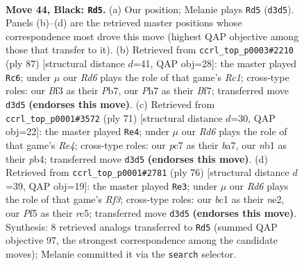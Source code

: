 \documentclass[11pt]{article}
\begin{document}
\clearpage

\begin{figure}[p]\centering
\begin{subfigure}{0.46\textwidth}\centering
\resizebox{\linewidth}{!}{%
\newchessgame
\chessboard[
  setfen={4K2k/n1P2p1p/p7/P4p2/4p3/3r1bP1/8/RNB5 b - - 2 44},
  showmover=false,
  pgfstyle=straightmove, color=movearrow, markmove={d3-d5}
]}
\caption{}
\end{subfigure}\hfill
\begin{subfigure}{0.46\textwidth}\centering
\resizebox{\linewidth}{!}{%
\newchessgame
\chessboard[
  setfen={2r5/1p3b2/rP3kp1/1N6/4p1p1/4P1K1/3R1P2/1R6 b - - 3 44},
  showmover=false,
  pgfstyle=straightmove, color=movearrow, markmove={c8-c6}
]}
\caption{}
\end{subfigure}
\\[4pt]
\begin{subfigure}{0.46\textwidth}\centering
\resizebox{\linewidth}{!}{%
\newchessgame
\chessboard[
  setfen={6k1/B1p3p1/2K2p2/4rb2/1PP4p/8/R5PP/8 b - - 6 36},
  showmover=false,
  pgfstyle=straightmove, color=movearrow, markmove={e5-e4}
]}
\caption{}
\end{subfigure}\hfill
\begin{subfigure}{0.46\textwidth}\centering
\resizebox{\linewidth}{!}{%
\newchessgame
\chessboard[
  setfen={5r2/1R1B3p/5k2/2rp1P1p/8/5R2/P3n1PK/8 w - - 4 39},
  showmover=false,
  pgfstyle=straightmove, color=movearrow, markmove={f3-e3}
]}
\caption{}
\end{subfigure}
\caption{\textbf{Move 44, Black: \texttt{Rd5}.} (a) Our position; Melanie plays \texttt{Rd5} (\texttt{d3d5}). Panels (b)--(d) are the retrieved master positions whose correspondence most drove this move (highest QAP objective among those that transfer to it). (b) Retrieved from \texttt{ccrl\_top\_p0003\#2210} (ply 87) [structural distance $d$=41, QAP obj=28]: the master played \texttt{Rc6}; under $\mu$ our \emph{Rd6} plays the role of that game's \emph{Rc1}; cross-type roles: our \emph{B}f3 as their \emph{P}b7, our \emph{P}h7 as their \emph{B}f7; transferred move \texttt{d3d5} \textbf{(endorses this move)}. (c) Retrieved from \texttt{ccrl\_top\_p0001\#3572} (ply 71) [structural distance $d$=30, QAP obj=22]: the master played \texttt{Re4}; under $\mu$ our \emph{Rd6} plays the role of that game's \emph{Re4}; cross-type roles: our \emph{p}c7 as their \emph{b}a7, our \emph{n}b1 as their \emph{p}b4; transferred move \texttt{d3d5} \textbf{(endorses this move)}. (d) Retrieved from \texttt{ccrl\_top\_p0001\#2781} (ply 76) [structural distance $d$=39, QAP obj=19]: the master played \texttt{Re3}; under $\mu$ our \emph{Rd6} plays the role of that game's \emph{Rf3}; cross-type roles: our \emph{b}c1 as their \emph{n}e2, our \emph{P}f5 as their \emph{r}c5; transferred move \texttt{d3d5} \textbf{(endorses this move)}. Synthesis: 8 retrieved analogs transferred to \texttt{Rd5} (summed QAP objective 97, the strongest correspondence among the candidate moves); Melanie committed it via the \texttt{search} selector.}
\label{fig:thought-m87}
\end{figure}
\end{document}
